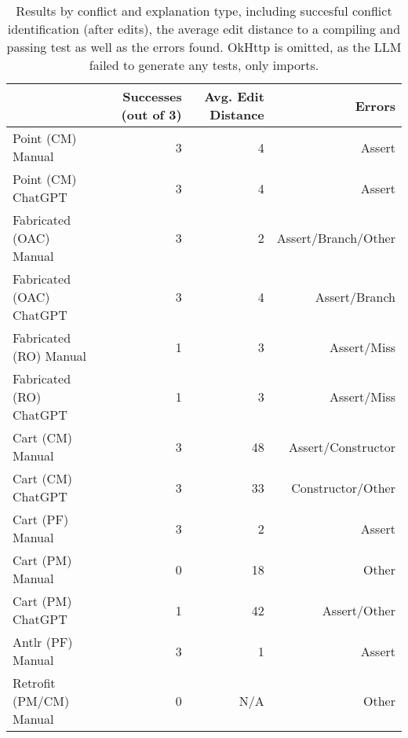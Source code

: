 \begin{table}[t]
    \centering
    \begin{tabular}{@{\extracolsep{\fill}} lrrr} \toprule
                             & Successes (out of 3) & Avg. Edit Distance & Errors \\
    \midrule
    Point (CM) Manual        & 3 & 4 & Assert \\
    Point (CM) ChatGPT       & 3 & 4 & Assert \\
    Fabricated (OAC) Manual  & 3 & 2 & Assert/Branch/Other \\
    Fabricated (OAC) ChatGPT & 3 & 4 & Assert/Branch \\
    Fabricated (RO) Manual   & 1 & 3 & Assert/Miss \\
    Fabricated (RO) ChatGPT  & 1 & 3 & Assert/Miss \\
    Cart (CM) Manual         & 3 & 48 & Assert/Constructor \\
    Cart (CM) ChatGPT        & 3 & 33 & Constructor/Other \\
    Cart (PF) Manual         & 3 & 2 & Assert \\
    Cart (PM) Manual         & 0 & 18 & Other \\
    Cart (PM) ChatGPT        & 1 & 42 & Assert/Other \\
    Antlr (PF) Manual        & 3 & 1 & Assert \\
    Retrofit (PM/CM) Manual  & 0 & N/A & Other \\
    \midrule
    \end{tabular}
    \caption{Results by conflict and explanation type, including succesful conflict identification (after edits), the average edit distance to a compiling and passing test as well as the errors found.
    OkHttp is omitted, as the LLM failed to generate any tests, only imports.
    \label{tab:results:rq2}}
\end{table}

